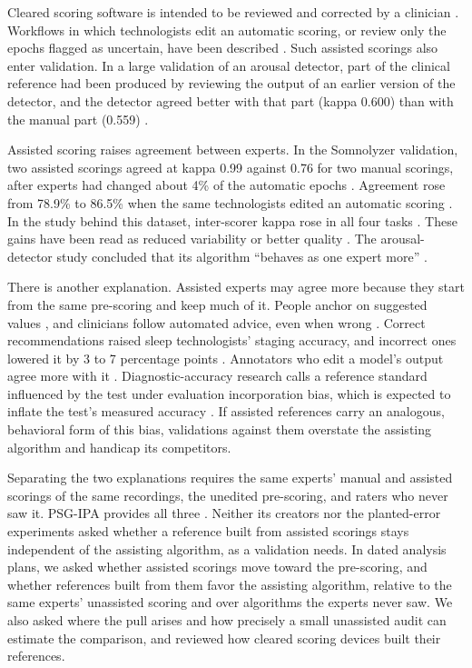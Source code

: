 \documentclass[11pt]{article}
\begin{document}
Cleared scoring software is intended to be reviewed and corrected by a clinician \citep{ensosleep2017}. Workflows in
which technologists edit an automatic scoring, or review only the epochs flagged as uncertain, have been described
\citep{younes2015,punjabi2015,rusanen2025}. Such assisted scorings also enter validation. In a large validation of an
arousal detector, part of the clinical reference had been produced by reviewing the output of an earlier version of the detector, and the detector agreed better with that part (kappa 0.600) than with the manual part (0.559) \citep{alvarezestevez2019}.

Assisted scoring raises agreement between experts. In the Somnolyzer validation, two assisted scorings agreed at
kappa 0.99 against 0.76 for two manual scorings, after experts had changed about 4\% of the automatic epochs
\citep{anderer2010}. Agreement rose from 78.9\% to 86.5\% when the same technologists edited an automatic scoring \citep{younes2016}. In
the study behind this dataset, inter-scorer kappa rose in all four tasks \citep{alvarezestevez2022}. These gains have
been read as reduced variability or better quality \citep{anderer2010,alvarezestevez2022}. The arousal-detector study
concluded that its algorithm ``behaves as one expert more'' \citep{alvarezestevez2019}.

There is another explanation. Assisted experts may agree more because they start from the same pre-scoring and
keep much of it. People anchor on suggested values \citep{tversky1974}, and clinicians follow automated advice, even when wrong
\citep{goddard2012,dratsch2023}. Correct recommendations raised sleep technologists' staging accuracy, and incorrect ones lowered it by 3 to 7
percentage points \citep{holm2026}. Annotators who edit a model's output agree more with it
\citep{berzak2016,schroeder2025}.
Diagnostic-accuracy research calls a reference standard influenced by the test under evaluation incorporation
bias, which is expected to inflate the test's measured accuracy \citep{whiting2004,worster2008,kampman2026}.
If assisted references carry an analogous, behavioral form of this bias, validations against them overstate the
assisting algorithm and handicap its competitors.

Separating the two explanations requires the same experts' manual and assisted scorings of the same recordings,
the unedited pre-scoring, and raters who never saw it. PSG-IPA provides all three
\citep{alvarezestevez2022,psgipa2026}. Neither its creators \citep{alvarezestevez2022} nor the planted-error experiments \citep{holm2026} asked whether a
reference built from assisted scorings stays independent of the assisting algorithm, as a validation needs. In dated analysis plans, we asked whether assisted scorings move toward the
pre-scoring, and whether references built from them favor the assisting algorithm, relative to the same experts'
unassisted scoring and over algorithms the experts never saw. We also asked where the pull arises and how precisely
a small unassisted audit can estimate the comparison, and reviewed how cleared scoring devices built their
references.
\end{document}
